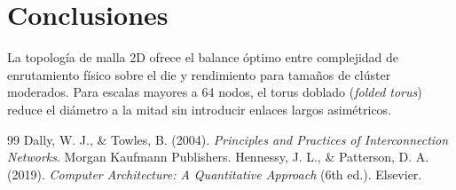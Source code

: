\section{Conclusiones}
La topología de malla 2D ofrece el balance óptimo entre complejidad de enrutamiento físico sobre el die y rendimiento para tamaños de clúster moderados. Para escalas mayores a 64 nodos, el torus doblado (\textit{folded torus}) reduce el diámetro a la mitad sin introducir enlaces largos asimétricos.

\begin{thebibliography}{99}
 Dally, W. J., \& Towles, B. (2004). \textit{Principles and Practices of Interconnection Networks}. Morgan Kaufmann Publishers.
 Hennessy, J. L., \& Patterson, D. A. (2019). \textit{Computer Architecture: A Quantitative Approach} (6th ed.). Elsevier.
\end{thebibliography}


